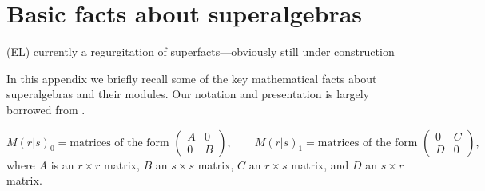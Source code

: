 \documentclass[12pt,a4paper]{article}
\newcommand\be            {\begin{equation}}
\newcommand\ee            {\end{equation}}
\newcommand{\ethan}[1]{{\color{amethyst}\footnotesize{(EL) #1}}}
\newcommand{\PsiEnd}{\mathord{\vcenter{\hbox{\texttt{[image: PsiEnd.pdf]}}}}}
\newcommand{\PsiEndExchange}{\mathord{\vcenter{\hbox{\texttt{[image: PsiEndExchange.pdf]}}}}}
\begin{document}

\section{Basic facts about superalgebras} \label{superstuff}

\ethan{currently a regurgitation of superfacts---obviously still under construction} 

In this appendix we briefly recall some of the key mathematical facts about superalgebras and their modules. 
Our notation and presentation is largely borrowed from \cite{jozefiak1988}.

\be M(r|s)_0 = \text{matrices of the form\ } \begin{pmatrix} A & 0 \\ 0 & B \end{pmatrix},\qquad M(r|s)_1 = \text{matrices of the form\ } \begin{pmatrix} 0 & C \\ D & 0 \end{pmatrix},\ee
where $A$ is an $r\times r$ matrix, $B$ an $s\times s$ matrix, $C$ an $r\times s$ matrix, and $D$ an $s\times r$ matrix. 
\end{document}
